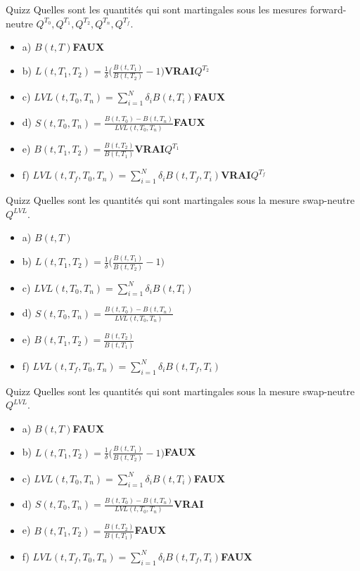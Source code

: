 \documentclass{beamer}
\begin{document}
\begin{frame}{Quizz}
Quelles sont les quantités qui sont martingales sous les mesures forward-neutre $Q^{T_0}, Q^{T_1},Q^{T_2}, Q^{T_n}, Q^{T_f}$.
\begin{itemize}
\item a) $B(t,T)$\textbf{\color{red}FAUX}
\item b) $L(t,T_1,T_2)=\frac{1}{\delta}\big(\frac{B(t,T_1)}{B(t,T_2)}-1 \big)$\textbf{\color{green}VRAI}$Q^{T_2}$
\item c) $\displaystyle LVL(t,T_0,T_n)=\sum_{i=1}^{N}\delta_i B(t,T_i)$\textbf{\color{red}FAUX}
\item d) $S(t,T_0,T_n)=\frac{B(t,T_0)-B(t,T_n)}{LVL(t,T_0,T_n)}$\textbf{\color{red}FAUX}
\item e) $B(t,T_1,T_2)=\frac{B(t,T_2)}{B(t,T_1)}$\textbf{\color{green}VRAI}$Q^{T_1}$ 
\item f) $\displaystyle LVL(t,T_f,T_0,T_n)=\sum_{i=1}^{N}\delta_i B(t,T_f,T_i)$\textbf{\color{green}VRAI}$Q^{T_f}$
\end{itemize}
\end{frame}

\begin{frame}{Quizz}
Quelles sont les quantités qui sont martingales sous la mesure swap-neutre $Q^{LVL}$.
\begin{itemize}
\item a) $B(t,T)$
\item b) $L(t,T_1,T_2)=\frac{1}{\delta}\big(\frac{B(t,T_1)}{B(t,T_2)}-1 \big)$
\item c) $\displaystyle LVL(t,T_0,T_n)=\sum_{i=1}^{N}\delta_i B(t,T_i)$
\item d) $S(t,T_0,T_n)=\frac{B(t,T_0)-B(t,T_n)}{LVL(t,T_0,T_n)}$
\item e) $B(t,T_1,T_2)=\frac{B(t,T_2)}{B(t,T_1)}$
\item f) $\displaystyle LVL(t,T_f,T_0,T_n)=\sum_{i=1}^{N}\delta_i B(t,T_f,T_i)$
\end{itemize}
\end{frame}


\begin{frame}{Quizz}
Quelles sont les quantités qui sont martingales sous la mesure swap-neutre $Q^{LVL}$.
\begin{itemize}
\item a) $B(t,T)$\textbf{\color{red}FAUX}
\item b) $L(t,T_1,T_2)=\frac{1}{\delta}\big(\frac{B(t,T_1)}{B(t,T_2)}-1 \big)$\textbf{\color{red}FAUX}
\item c) $\displaystyle LVL(t,T_0,T_n)=\sum_{i=1}^{N}\delta_i B(t,T_i)$\textbf{\color{red}FAUX}
\item d) $S(t,T_0,T_n)=\frac{B(t,T_0)-B(t,T_n)}{LVL(t,T_0,T_n)}$\textbf{\color{green}VRAI}
\item e) $B(t,T_1,T_2)=\frac{B(t,T_2)}{B(t,T_1)}$\textbf{\color{red}FAUX} 
\item f) $\displaystyle LVL(t,T_f,T_0,T_n)=\sum_{i=1}^{N}\delta_i B(t,T_f,T_i)$\textbf{\color{red}FAUX}
\end{itemize}
\end{frame}
\end{document}
